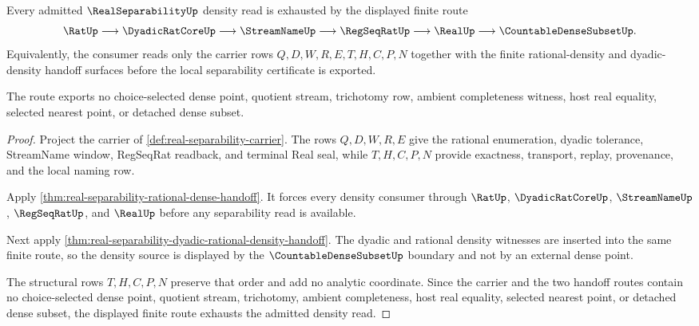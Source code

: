 \begin{theorem}
\label{thm:real-separability-finite-density-exhaustion}
Every admitted $\RealSeparabilityUp$ density read is exhausted by the displayed finite route
$$
\RatUp \longrightarrow \DyadicRatCoreUp \longrightarrow \StreamNameUp \longrightarrow \RegSeqRatUp \longrightarrow \RealUp \longrightarrow \CountableDenseSubsetUp .
$$
Equivalently, the consumer reads only the carrier rows $Q,D,W,R,E,T,H,C,P,N$ together with the finite rational-density and dyadic-density handoff surfaces before the local separability certificate is exported.

The route exports no choice-selected dense point, quotient stream, trichotomy row, ambient completeness witness, host real equality, selected nearest point, or detached dense subset.
\end{theorem}
\begin{proof}
Project the carrier of \autoref{def:real-separability-carrier}. The rows $Q,D,W,R,E$ give the rational enumeration, dyadic tolerance, StreamName window, RegSeqRat readback, and terminal Real seal, while $T,H,C,P,N$ provide exactness, transport, replay, provenance, and the local naming row.

Apply \autoref{thm:real-separability-rational-dense-handoff}. It forces every density consumer through $\RatUp$, $\DyadicRatCoreUp$, $\StreamNameUp$, $\RegSeqRatUp$, and $\RealUp$ before any separability read is available.

Next apply \autoref{thm:real-separability-dyadic-rational-density-handoff}. The dyadic and rational density witnesses are inserted into the same finite route, so the density source is displayed by the $\CountableDenseSubsetUp$ boundary and not by an external dense point.

The structural rows $T,H,C,P,N$ preserve that order and add no analytic coordinate. Since the carrier and the two handoff routes contain no choice-selected dense point, quotient stream, trichotomy, ambient completeness, host real equality, selected nearest point, or detached dense subset, the displayed finite route exhausts the admitted density read.
\end{proof}

